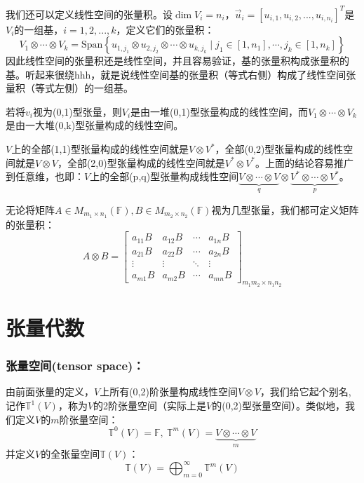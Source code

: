 \documentclass[zihao=5,UTF8]{report}
\def\F{\mathbb{F}}
\def\T{\mathbb{T}}
\theoremstyle{mystyle} %
\begin{document}
\noindent 我们还可以定义线性空间的张量积。设$\dim V_i = n_i$，$\vec{u}_i = [u_{i,1}, u_{i,2},..., u_{i,n_i}]^T$是$V_i$的一组基，$i=1,2,...,k$，定义它们的张量积：
\begin{equation*}
    V_1 \otimes \cdots \otimes V_k = \text{Span}\left\{ u_{1,j_1} \otimes u_{2,j_2} \otimes \cdots \otimes u_{k,j_k} \mid j_1 \in [1, n_1],\cdots,j_k \in [1, n_k]\right\}
\end{equation*}
因此线性空间的张量积还是线性空间，并且容易验证，基的张量积构成张量积的基。听起来很绕hhh，就是说线性空间基的张量积（等式右侧）构成了线性空间张量积（等式左侧）的一组基。
{\par\color{gray}\small
若将$v_i$视为(0,1)型张量，则$V_i$是由一堆(0,1)型张量构成的线性空间，而$V_1 \otimes \cdots \otimes V_k$是由一大堆(0,k)型张量构成的线性空间。
\par}
$V$上的全部(1,1)型张量构成的线性空间就是$V\otimes V^*$，全部(0,2)型张量构成的线性空间就是$V \otimes V$，全部(2,0)型张量构成的线性空间就是$V^* \otimes V^*$。上面的结论容易推广到任意维，也即：$V$上的全部(p,q)型张量构成线性空间$\underbrace{V\otimes\cdots\otimes V}_{q}\otimes\underbrace{V^* \otimes\cdots\otimes V^*}_{p}$。

无论将矩阵$A\in M_{m_1\times n_1}(\F),  B \in M_{m_2\times n_2}(\F)$视为几型张量，我们都可定义矩阵的张量积：
\begin{equation*}
    A \otimes B = 
    \begin{bmatrix}  
        a_{11}B& a_{12}B& \cdots  & a_{1n}B \\  
        a_{21}B& a_{22}B& \cdots  & a_{2n}B \\  
        \vdots & \vdots & \ddots & \vdots \\  
        a_{m1}B& a_{m2}B& \cdots  & a_{mn}B  
    \end{bmatrix}_{m_1m_2\times n_1n_2}
\end{equation*}

\section{张量代数}

\subsubsection{张量空间(tensor space)：}
由前面张量的定义，$V$上所有(0,2)阶张量构成线性空间$V\otimes V$，我们给它起个别名,记作$\T^1(V)$，称为$V$的2阶张量空间（实际上是$V$的(0,2)型张量空间）。类似地，我们定义$V$的$m$阶张量空间：
\begin{equation*}
    \T^0(V) = \F,\ \T^m(V) = \underbrace{V\otimes\cdots\otimes V}_{m}
\end{equation*}
并定义$V$的全张量空间$\T(V)$：
\begin{equation*}
\T(V) = \bigoplus_{m = 0}^{\infty} \T^m(V)
\end{equation*}
\end{document}
